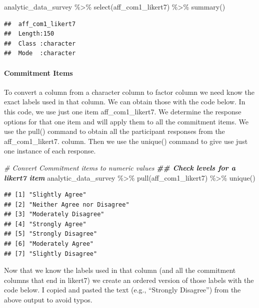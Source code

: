 \documentclass[
]{krantz}
\makeatletter
\newenvironment{Shaded}{\begin{snugshade}}{\end{snugshade}}
\newcommand{\CommentTok}[1]{\textcolor[rgb]{0.37,0.37,0.37}{\textit{#1}}}
\newcommand{\DocumentationTok}[1]{\textcolor[rgb]{0.37,0.37,0.37}{\textbf{\textit{#1}}}}
\newcommand{\FunctionTok}[1]{\textcolor[rgb]{0,0,0}{#1}}
\newcommand{\NormalTok}[1]{#1}
\newcommand{\SpecialCharTok}[1]{\textcolor[rgb]{0,0,0}{#1}}
\newenvironment{kframe}{%
\medskip{}
\setlength{\fboxsep}{.8em}
 \def\at@end@of@kframe{}%
 \ifinner\ifhmode%
  \def\at@end@of@kframe{\end{minipage}}%
  \begin{minipage}{\columnwidth}%
 \fi\fi%
 \def\FrameCommand##1{\hskip\@totalleftmargin \hskip-\fboxsep
 \colorbox{shadecolor}{##1}\hskip-\fboxsep
     \hskip-\linewidth \hskip-\@totalleftmargin \hskip\columnwidth}%
 \MakeFramed {\advance\hsize-\width
   \@totalleftmargin\z@ \linewidth\hsize
   \@setminipage}}%
 {\par\unskip\endMakeFramed%
 \at@end@of@kframe}
\renewenvironment{Shaded}{\begin{kframe}}{\end{kframe}}
\makeatother
\begin{document}
\begin{Shaded}
\begin{Highlighting}[]
\NormalTok{analytic\_data\_survey }\SpecialCharTok{\%\textgreater{}\%} 
    \FunctionTok{select}\NormalTok{(aff\_com1\_likert7) }\SpecialCharTok{\%\textgreater{}\%}
    \FunctionTok{summary}\NormalTok{()}
\end{Highlighting}
\end{Shaded}

\begin{verbatim}
##  aff_com1_likert7  
##  Length:150        
##  Class :character  
##  Mode  :character
\end{verbatim}

\hypertarget{commitment-items}{%
\paragraph{Commitment Items}\label{commitment-items}}

To convert a column from a character column to factor column we need know the exact labels used in that column. We can obtain those with the code below. In this code, we use just one item aff\_com1\_likert7. We determine the response options for that one item and will apply them to all the commitment items. We use the pull() command to obtain all the participant responses from the aff\_com1\_likert7. column. Then we use the unique() command to give use just one instance of each response.

\begin{Shaded}
\begin{Highlighting}[]
\CommentTok{\# Convert Commitment items to numeric  values}
\DocumentationTok{\#\# Check levels for a likert7 item}
\NormalTok{analytic\_data\_survey }\SpecialCharTok{\%\textgreater{}\%}
  \FunctionTok{pull}\NormalTok{(aff\_com1\_likert7) }\SpecialCharTok{\%\textgreater{}\%}
  \FunctionTok{unique}\NormalTok{()}
\end{Highlighting}
\end{Shaded}

\begin{verbatim}
## [1] "Slightly Agree"            
## [2] "Neither Agree nor Disagree"
## [3] "Moderately Disagree"       
## [4] "Strongly Agree"            
## [5] "Strongly Disagree"         
## [6] "Moderately Agree"          
## [7] "Slightly Disagree"
\end{verbatim}

Now that we know the labels used in that column (and all the commitment columns that end in likert7) we create an ordered version of those labels with the code below. I copied and pasted the text (e.g., ``Strongly Disagree'') from the above output to avoid typos.
\end{document}
